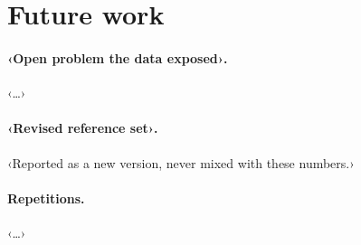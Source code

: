 \section{Future work}
\label{sec:future}
\paragraph{‹Open problem the data exposed›.} ‹…›
\paragraph{‹Revised reference set›.} ‹Reported as a new version, never mixed with these numbers.›
\paragraph{Repetitions.} ‹…›
